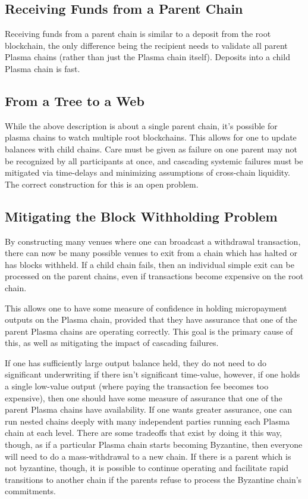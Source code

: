 \documentclass[letterpaper, 11pt]{article}
\begin{document}
\subsection{Receiving Funds from a Parent Chain}

Receiving funds from a parent chain is similar to a deposit from the root
blockchain, the only difference being the recipient needs to validate all parent
Plasma chains (rather than just the Plasma chain itself). Deposits into a child
Plasma chain is fast.

\subsection{From a Tree to a Web}

While the above description is about a single parent chain, it's possible for
plasma chains to watch multiple root blockchains. This allows for one to update
balances with child chains. Care must be given as failure on one parent may not
be recognized by all participants at once, and cascading systemic failures must
be mitigated via time-delays and minimizing assumptions of cross-chain
liquidity. The correct construction for this is an open problem.

\subsection{Mitigating the Block Withholding Problem}

By constructing many venues where one can broadcast a withdrawal transaction,
there can now be many possible venues to exit from a chain which has halted or
has blocks withheld. If a child chain fails, then an individual simple exit can
be processed on the parent chains, even if transactions become expensive on the
root chain.

This allows one to have some measure of confidence in holding micropayment
outputs on the Plasma chain, provided that they have assurance that one of the
parent Plasma chains are operating correctly. This goal is the primary cause of
this, as well as mitigating the impact of cascading failures.

If one has sufficiently large output balance held, they do not need to do
significant underwriting if there isn't significant time-value, however, if one
holds a single low-value output (where paying the transaction fee becomes too
expensive), then one should have some measure of assurance that one of the
parent Plasma chains have availability. If one wants greater assurance, one can
run nested chains deeply with many independent parties running each Plasma chain
at each level. There are some tradeoffs that exist by doing it this way, though,
as if a particular Plasma chain starts becoming Byzantine, then everyone will
need to do a mass-withdrawal to a new chain. If there is a parent which is not
byzantine, though, it is possible to continue operating and facilitate rapid
transitions to another chain if the parents refuse to process the Byzantine
chain's commitments.
\end{document}
